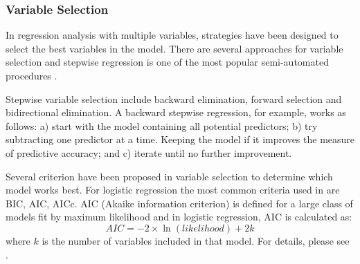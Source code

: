 \documentclass[12pt,english]{report}
\begin{document}

\subsubsection{Variable Selection}
In regression analysis with multiple variables, strategies have been designed
to select the best variables in the model. There are several approaches for
variable selection and stepwise regression is one of the most popular
semi-automated procedures \citep{Han2011}.

Stepwise variable selection include backward elimination, forward selection and
bidirectional elimination. A backward stepwise regression, for example, works
as follows: a) start with the model containing all potential predictors; b) try
subtracting one predictor at a time. Keeping the model if it improves the
measure of predictive accuracy; and c) iterate until no further improvement.

Several criterion have been proposed in variable selection to determine which
model works best. For logistic regression the most common criteria used in  are
BIC, AIC, AICc.  AIC (Akaike information criterion) is defined for a large
class of models fit by maximum likelihood and in logistic regression, AIC is
calculated as:
\begin{equation}
	AIC= -2 \times \ln(likelihood) + 2k
\end{equation}
where $k$ is the number of variables included in that model. For details,
please see  \citep{Han2011}.
	
\end{document}
